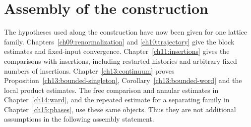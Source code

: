\section{Assembly of the construction}
\label{ch19:theorem-section}

The hypotheses used along the construction have now been given for
one lattice family. Chapters~\ref{ch09:renormalization} and
\ref{ch10:trajectory} give the block estimates and fixed-input
convergence. Chapter~\ref{ch11:insertions} gives the comparisons with insertions,
including restarted histories and arbitrary fixed numbers of insertions.
Chapter~\ref{ch13:continuum} proves Proposition~\ref{ch13:bounded-singleton}, Corollary~\ref{ch13:bounded-word} and the
local product estimates. The free comparison and annular estimates in
Chapter~\ref{ch14:ward}, and the repeated estimate for a separating family in
Chapter~\ref{ch15:phases}, use these same objects. Thus they are not
additional assumptions in the following assembly statement.

